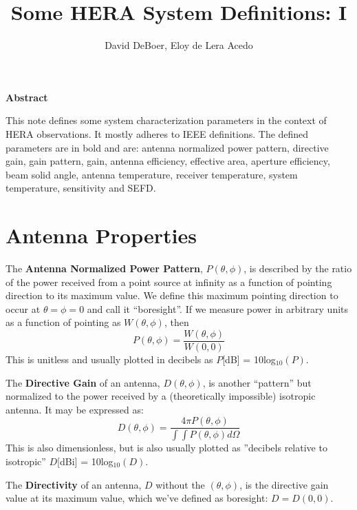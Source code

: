 \documentclass[11pt]{article}
\begin{document}
\title{Some HERA System Definitions: I}
\author{David DeBoer, Eloy de Lera Acedo}
\maketitle

\begin{center}
{\bf Abstract}
\end{center}

\small
\begin{adjustwidth}{1in}{1in}
This note defines some system characterization parameters in the context of HERA observations.  It mostly adheres to IEEE definitions.  The defined parameters are in bold and are: antenna normalized power pattern, directive gain, gain pattern, gain, antenna efficiency, effective area, aperture efficiency, beam solid angle, antenna temperature, receiver temperature, system temperature, sensitivity and SEFD.
\end{adjustwidth}

\section{Antenna Properties}
The {\bf Antenna Normalized Power Pattern}, $P(\theta,\phi)$, is described by the ratio of the power received from a point source at infinity as a function of pointing direction to its maximum value.  We define this maximum pointing direction to occur at $\theta = \phi = 0$ and call it ``boresight''.  If we measure power in arbitrary units as a function of pointing as $W(\theta,\phi)$, then
\begin{equation}
P(\theta,\phi) = \frac{W(\theta,\phi)}{W(0,0)}
\end{equation}
This is unitless and usually plotted in decibels as $P$[dB] = 10log$_{10}(P)$.

The {\bf Directive Gain} of an antenna, $D(\theta,\phi)$, is another ``pattern'' but normalized to the power received by a (theoretically impossible) isotropic antenna.  It may be expressed as:
\begin{equation}
D(\theta,\phi) = \frac{4\pi P(\theta,\phi)}{\int\int P(\theta,\phi)d\Omega}
\end{equation} 
This is also dimensionless, but is also usually plotted as ''decibels relative to isotropic'' $D$[dBi] = 10log$_{10}(D)$.

The {\bf Directivity} of an antenna, $D$ without the $(\theta,\phi)$, is the directive gain value at its maximum value, which we've defined as boresight:  $D = D(0,0)$.
\end{document}
